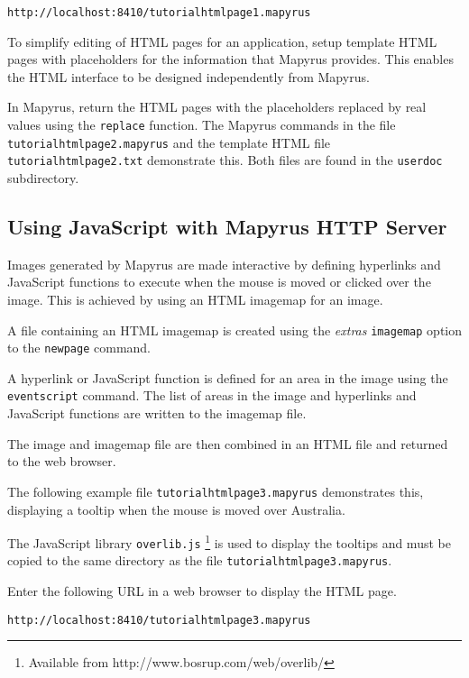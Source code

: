 \begin{verbatim}
http://localhost:8410/tutorialhtmlpage1.mapyrus
\end{verbatim}

To simplify editing of HTML pages for an application, setup
template HTML pages with placeholders for the information that
Mapyrus provides.  This enables the HTML interface to be designed
independently from Mapyrus.

In Mapyrus, return the HTML pages with the placeholders
replaced by real values using the
\texttt{replace}
function.  The Mapyrus commands in the file \texttt{tutorialhtmlpage2.mapyrus}
and the template HTML file \texttt{tutorialhtmlpage2.txt}
demonstrate this.  Both files are found in the
\texttt{userdoc} subdirectory.

\subsection{Using JavaScript with Mapyrus HTTP Server}
\label{tutorialjavascript}

Images generated by Mapyrus are made interactive by defining hyperlinks and
JavaScript functions to execute when the mouse is moved or clicked over the
image.  This is achieved by using an HTML imagemap for an image.

A file containing an HTML imagemap is created using the \textit{extras}
\texttt{imagemap} option to the \texttt{newpage} command.

A hyperlink or JavaScript function is defined for an area in the image using
the \texttt{eventscript} command.  The list of areas in the image and
hyperlinks and JavaScript functions are written to the imagemap file.

The image and imagemap file are then combined in an HTML file
and returned to the web browser.

The following example file \texttt{tutorialhtmlpage3.mapyrus}
demonstrates this, displaying a tooltip when
the mouse is moved over Australia.



The JavaScript library \texttt{overlib.js}
\footnote{Available from http://www.bosrup.com/web/overlib/} is
used to display the tooltips and must be copied to the same
directory as the file \texttt{tutorialhtmlpage3.mapyrus}.

Enter the following URL in a web browser to display the HTML page.

\begin{verbatim}
http://localhost:8410/tutorialhtmlpage3.mapyrus
\end{verbatim}

